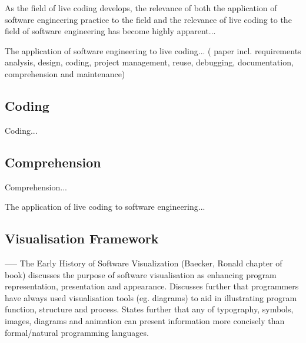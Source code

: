 As the field of live coding develops, the relevance of both the application of software engineering practice to the field and the relevance of live coding to the field of software engineering has become highly apparent...

The application of software engineering to live coding...
(\cite{Blackwell2005} paper incl. requirements analysis, design, coding, project management, reuse, debugging, documentation, comprehension and maintenance)

\subsection{Coding}
Coding...
\subsection{Comprehension}
Comprehension...

The application of live coding to software engineering...

\subsection{Visualisation Framework}











-----
The Early History of Software Visualization (Baecker, Ronald chapter of book) discusses the purpose of software visualisation as enhancing program representation, presentation and appearance. Discusses further that programmers have always used visualisation tools (eg. diagrams) to aid in illustrating program function, structure and process. States further that any of typography, symbols, images, diagrams and animation can present information more concisely than formal/natural programming languages. 

